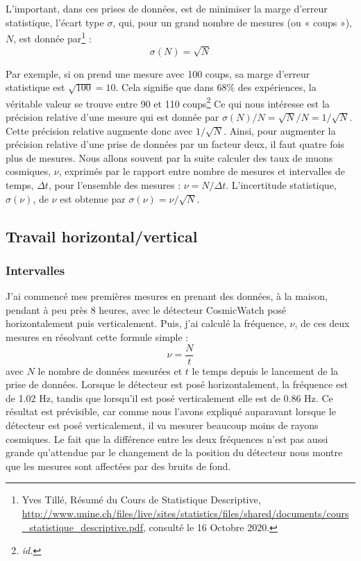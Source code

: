 \documentclass[a4paper, 12pt]{article}
\begin{document}
\begin{spacing}{1.5}
L'important, dans ces prises de données, est de minimiser la marge d’erreur statistique, l'écart type $\sigma$, qui, pour un grand nombre de mesures (ou « coups »), $N$, est donnée par\footnote{Yves Tillé, Résumé du Cours de Statistique Descriptive, \url{http://www.unine.ch/files/live/sites/statistics/files/shared/documents/cours_statistique_descriptive.pdf}, consulté le 16 Octobre 2020.} :
\begin{equation}
\sigma(N) = \sqrt{N} \label{eq:error}
\end{equation}

Par exemple, si on prend une mesure avec 100 coups, sa marge d'erreur statistique est $\sqrt{100}=10$. Cela signifie que dans 68\% des expériences, la véritable valeur se trouve entre 90 et 110 coups\footnote{\emph{id.}} Ce qui nous intéresse est la précision relative d'une mesure qui est donnée par $\sigma(N)/N=\sqrt{N}/N=1/\sqrt{N}$. Cette précision relative augmente donc avec $1/\sqrt{N}$. Ainsi, pour augmenter la précision relative d'une prise de données par un facteur deux, il faut quatre fois plus de mesures. Nous allons souvent par la suite calculer des taux de muons cosmiques, $\nu$, exprimés par le rapport entre nombre de mesures et intervalles de temps, $\Delta t$, pour l'ensemble des mesures : $\nu=N/\Delta t$. L'incertitude statistique, $\sigma(\nu)$, de $\nu$ est obtenue par $\sigma(\nu)=\nu/\sqrt{N}$.

\subsection{Travail horizontal/vertical}

\subsubsection{Intervalles}

J'ai commencé mes premières mesures en prenant des données, à la maison, pendant à peu près 8 heures, avec le détecteur CosmicWatch posé horizontalement puis verticalement. Puis, j'ai calculé la fréquence, $\nu$, de ces deux mesures en résolvant cette formule simple :
\begin{equation}
\nu = \frac{N}{t} \label{eq:freq}
\end{equation}
avec $N$ le nombre de données mesurées et $t$ le temps depuis le lancement de la prise de données. Lorsque le détecteur est posé horizontalement, la fréquence est de 1.02 Hz, tandis que lorsqu'il est posé verticalement elle est de 0.86 Hz. Ce résultat est prévisible, car comme nous l'avons expliqué auparavant lorsque le détecteur est posé verticalement, il va mesurer beaucoup moins de rayons cosmiques. Le fait que la différence entre les deux fréquences n'est pas aussi grande qu'attendue par le changement de la position du détecteur nous montre que les mesures sont affectées par des bruits de fond.


\end{spacing}
\end{document}

